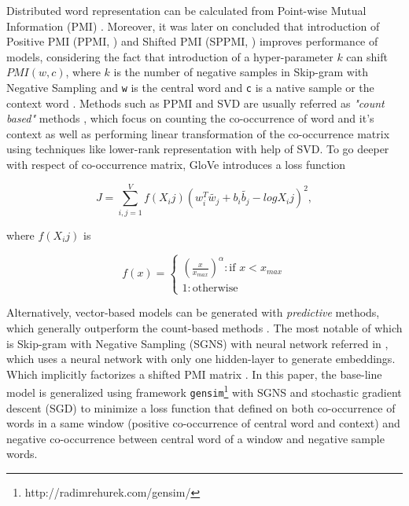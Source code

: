 Distributed word representation can be calculated from Point-wise Mutual Information (PMI) \cite{church1990word}. Moreover, it was later on concluded that introduction of Positive PMI (PPMI, \cite{bullinaria2007extracting}) and Shifted PMI (SPPMI, \cite{goldberg2014word2vec}) improves performance of models, considering the fact that introduction of a hyper-parameter $k$ can shift $PMI(w, c)$, where $k$ is the number of negative samples in Skip-gram with Negative Sampling and \verb|w| is the central word and \verb|c| is a native sample or the context word \cite{levy2014neural}. Methods such as PPMI and SVD are usually referred as \emph{"count based"} methods \cite{levy2015improving}, which focus on counting the co-occurrence of word and it's context as well as performing linear transformation of the co-occurrence matrix using techniques like lower-rank representation with help of SVD. To go deeper with respect of co-occurrence matrix, GloVe \cite{Pennington2014glove} introduces a loss function

\begin{equation}
J=\sum_{i,j=1}^{V}f(X_ij)(w_i^T\tilde{w_j}+b_i\tilde{b_j}-logX_ij)^2,
\end{equation}

where $f(X_ij)$ is

\[f(x)=\begin{cases}
    (\frac{x}{x_{max}})^\alpha : \text{if }x<x_{max}\\
    1 : \text{otherwise}
    \end{cases}
\]

Alternatively, vector-based models can be generated with \emph{predictive} methods, which generally outperform the count-based methods \cite{levy2015improving}. The most notable of which is Skip-gram with Negative Sampling (SGNS) with neural network referred in \cite{mikolov2013distributed}, which uses a neural network with only one hidden-layer to generate embeddings. Which implicitly factorizes a shifted PMI matrix \cite{levy2014neural}. In this paper, the base-line model is generalized using framework \verb|gensim|\footnote{http://radimrehurek.com/gensim/} with SGNS and stochastic gradient descent (SGD) to minimize a loss function that defined on both co-occurrence of words in a same window (positive co-occurrence of central word and context) and negative co-occurrence between central word of a window and negative sample words. 
